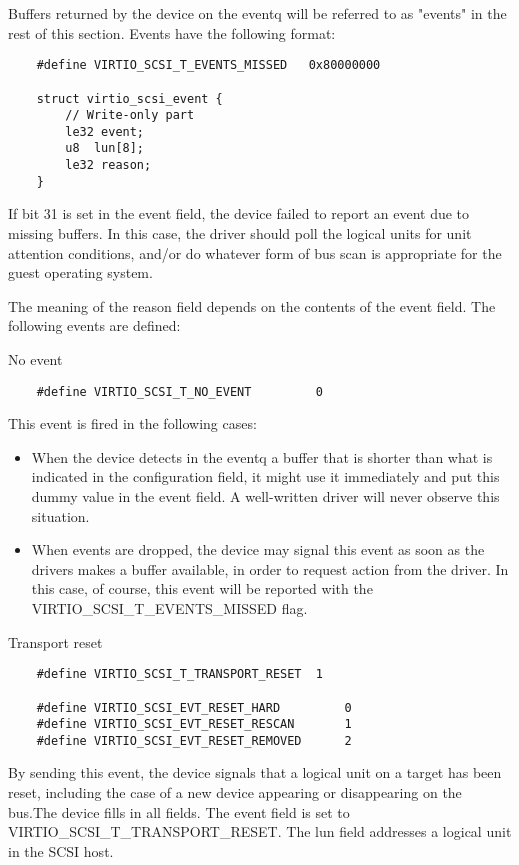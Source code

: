 Buffers returned by the device on the eventq will be referred to
as "events" in the rest of this section. Events have the
following format:

\begin{lstlisting}
	#define VIRTIO_SCSI_T_EVENTS_MISSED   0x80000000

	struct virtio_scsi_event {
		// Write-only part
		le32 event;
		u8  lun[8];
		le32 reason;
	}
\end{lstlisting}

If bit 31 is set in the event field, the device failed to report
an event due to missing buffers. In this case, the driver should
poll the logical units for unit attention conditions, and/or do
whatever form of bus scan is appropriate for the guest operating
system.

The meaning of the reason field depends on the
contents of the event field. The following events are defined:

  No event
\begin{lstlisting}
	#define VIRTIO_SCSI_T_NO_EVENT         0
\end{lstlisting}

  This event is fired in the following cases:

\begin{itemize}
  \item When the device detects in the eventq a buffer that is
    shorter than what is indicated in the configuration field, it
    might use it immediately and put this dummy value in the
    event field. A well-written driver will never observe this
    situation.

  \item When events are dropped, the device may signal this event as
    soon as the drivers makes a buffer available, in order to
    request action from the driver. In this case, of course, this
    event will be reported with the VIRTIO_SCSI_T_EVENTS_MISSED
    flag.
\end{itemize}

  Transport reset
\begin{lstlisting}
	#define VIRTIO_SCSI_T_TRANSPORT_RESET  1

	#define VIRTIO_SCSI_EVT_RESET_HARD         0
	#define VIRTIO_SCSI_EVT_RESET_RESCAN       1
	#define VIRTIO_SCSI_EVT_RESET_REMOVED      2
\end{lstlisting}

  By sending this event, the device signals that a logical unit
  on a target has been reset, including the case of a new device
  appearing or disappearing on the bus.The device fills in all
  fields. The event field is set to
  VIRTIO_SCSI_T_TRANSPORT_RESET. The lun field addresses a
  logical unit in the SCSI host.

